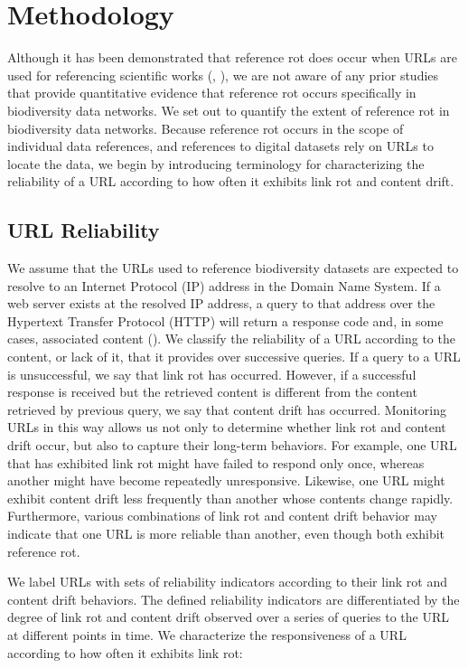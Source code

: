 \documentclass[12pt,letterpaper]{article}
\begin{document}
\section*{Methodology}

Although it has been demonstrated that reference rot does occur when URLs are used for referencing scientific works (\cite{Vision_2010}, \cite{Klein_2014}), we are not aware of any prior studies that provide quantitative evidence that reference rot occurs specifically in biodiversity data networks. We set out to quantify the extent of reference rot in biodiversity data networks. Because reference rot occurs in the scope of individual data references, and references to digital datasets rely on URLs to locate the data, we begin by introducing terminology for characterizing the reliability of a URL according to how often it exhibits link rot and content drift.

\subsection*{URL Reliability}
We assume that the URLs used to reference biodiversity datasets are expected to resolve to an Internet Protocol (IP) address in the Domain Name System. If a web server exists at the resolved IP address, a query to that address over the Hypertext Transfer Protocol (HTTP) will return a response code and, in some cases, associated content (\cite{rfc3986}).  We classify the reliability of a URL according to the content, or lack of it, that it provides over successive queries. If a query to a URL is unsuccessful, we say that link rot has occurred. However, if a successful response is received but the retrieved content is different from the content retrieved by previous query, we say that content drift has occurred. Monitoring URLs in this way allows us not only to determine whether link rot and content drift occur, but also to capture their long-term behaviors. For example, one URL that has exhibited link rot might have failed to respond only once, whereas another might have become repeatedly unresponsive. Likewise, one URL might exhibit content drift less frequently than another whose contents change rapidly. Furthermore, various combinations of link rot and content drift behavior may indicate that one URL is more reliable than another, even though both exhibit reference rot.

We label URLs with sets of reliability indicators according to their link rot and content drift behaviors. The defined reliability indicators are differentiated by the degree of link rot and content drift observed over a series of queries to the URL at different points in time. We characterize the responsiveness of a URL according to how often it exhibits link rot: 
\end{document}
